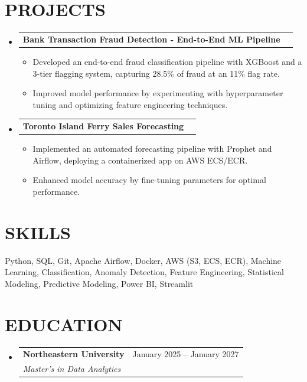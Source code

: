 \documentclass[letterpaper,11pt]{article}
\makeatletter
\newcommand{\resumeItem}[1]{\item{#1 \vspace{-2pt}}}
\newcommand{\resumeSubheading}[4]{
  \vspace{-2pt}\item
    \begin{tabular*}{0.97\textwidth}[t]{l@{\extracolsep{\fill}}r}
      \textbf{#1} & #2 \\
      \textit{#3} & \textit{#4} \\
    \end{tabular*}\vspace{-7pt}
}
\newcommand{\resumeProjectHeading}[2]{
    \item
    \begin{tabular*}{0.97\textwidth}{l@{\extracolsep{\fill}}r}
      #1 & #2 \\
    \end{tabular*}\vspace{-7pt}
}
\newcommand{\resumeSubHeadingListStart}{\begin{itemize}[leftmargin=0pt, label={}]}
\newcommand{\resumeSubHeadingListEnd}{\end{itemize}}
\newcommand{\resumeItemListStart}{\begin{itemize}[leftmargin=0.2in, label={$\bullet$}]}
\newcommand{\resumeItemListEnd}{\end{itemize}\vspace{-5pt}}
\makeatother
\begin{document}
\section{\MakeUppercase{Projects}}
\resumeSubHeadingListStart
\resumeProjectHeading
  {\textbf{Bank Transaction Fraud Detection - End-to-End ML Pipeline}}{}
\resumeItemListStart
  \resumeItem{Developed an end-to-end fraud classification pipeline with XGBoost and a 3-tier flagging system, capturing 28.5\% of fraud at an 11\% flag rate.}
  \resumeItem{Improved model performance by experimenting with hyperparameter tuning and optimizing feature engineering techniques.}
\resumeItemListEnd
\resumeProjectHeading
  {\textbf{Toronto Island Ferry Sales Forecasting}}{}
\resumeItemListStart
  \resumeItem{Implemented an automated forecasting pipeline with Prophet and Airflow, deploying a containerized app on AWS ECS/ECR.}
  \resumeItem{Enhanced model accuracy by fine-tuning parameters for optimal performance.}
\resumeItemListEnd
\resumeSubHeadingListEnd

\section{\MakeUppercase{Skills}}
\begin{itemize}[leftmargin=0.01in, label={}]
    \small{\item{Python, SQL, Git, Apache Airflow, Docker, AWS (S3, ECS, ECR), Machine Learning, Classification, Anomaly Detection, Feature Engineering, Statistical Modeling, Predictive Modeling, Power BI, Streamlit}}
\end{itemize}


\section{\MakeUppercase{Education}}
\resumeSubHeadingListStart
\resumeSubheading
  {Northeastern University}{January 2025 -- January 2027}
  {Master's in Data Analytics}{}
\resumeSubHeadingListEnd
\end{document}
